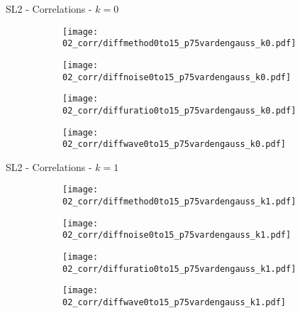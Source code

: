 \documentclass{beamer}
\begin{document}
\begin{frame}{SL2 - Correlations - $k=0$}{}
\begin{figure}
\centering
\begin{subfigure}{0.19\textwidth}
\texttt{[image: 02\_corr/diffmethod0to15\_p75vardengauss\_k0.pdf]}
\end{subfigure}
\begin{subfigure}{0.19\textwidth}
\texttt{[image: 02\_corr/diffnoise0to15\_p75vardengauss\_k0.pdf]}
\end{subfigure}
\begin{subfigure}{0.19\textwidth}
\end{subfigure}
\begin{subfigure}{0.19\textwidth}
\texttt{[image: 02\_corr/diffuratio0to15\_p75vardengauss\_k0.pdf]}
\end{subfigure}
\begin{subfigure}{0.19\textwidth}
\texttt{[image: 02\_corr/diffwave0to15\_p75vardengauss\_k0.pdf]}
\end{subfigure}
\end{figure}
\end{frame}

\begin{frame}{SL2 - Correlations - $k=1$}{}
\begin{figure}
\centering
\begin{subfigure}{0.19\textwidth}
\texttt{[image: 02\_corr/diffmethod0to15\_p75vardengauss\_k1.pdf]}
\end{subfigure}
\begin{subfigure}{0.19\textwidth}
\texttt{[image: 02\_corr/diffnoise0to15\_p75vardengauss\_k1.pdf]}
\end{subfigure}
\begin{subfigure}{0.19\textwidth}
\end{subfigure}
\begin{subfigure}{0.19\textwidth}
\texttt{[image: 02\_corr/diffuratio0to15\_p75vardengauss\_k1.pdf]}
\end{subfigure}
\begin{subfigure}{0.19\textwidth}
\texttt{[image: 02\_corr/diffwave0to15\_p75vardengauss\_k1.pdf]}
\end{subfigure}
\end{figure}
\end{frame}
\end{document}
